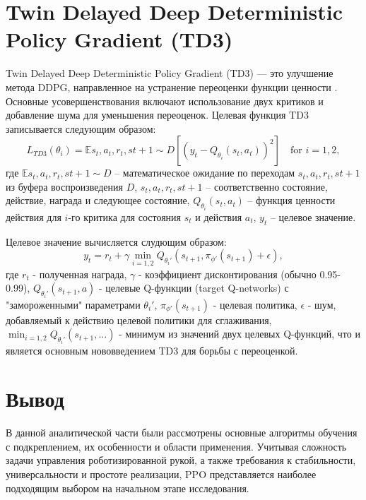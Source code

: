 \section{Twin Delayed Deep Deterministic Policy Gradient (TD3)}
Twin Delayed Deep Deterministic Policy Gradient (TD3) — это улучшение метода DDPG, 
направленное на устранение переоценки функции ценности \cite{lib:rlmethods}. 
Основные усовершенствования включают использование двух критиков и добавление шума для уменьшения переоценок. 
Целевая функция TD3 записывается следующим образом:
\begin{equation}
L_{TD3}(\theta_i) = \mathbb{E}{s_t, a_t, r_t, s{t+1} \sim D} \left[ \left( y_t - Q_{\theta_i}(s_t, a_t) \right)^2 \right] \quad \text{for } i = 1, 2,
\end{equation}
где 
$\mathbb{E}{s_t, a_t, r_t, s{t+1} \sim D}$ -- математическое ожидание по переходам ${s_t, a_t, r_t, s{t+1}}$ из буфера воспроизведения $D$,
${s_t, a_t, r_t, s{t+1}}$ -- соответственно состояние, действие, награда и следующее состояние,
$Q_{\theta_i}(s_t, a_t)$ -- функция ценности действия для $i$-го критика для состояния $s_t$ и действия $a_t$,
$y_t$ -- целевое значение.

Целевое значение вычисляется слудющим образом:
\begin{equation}
    y_t = r_t + \gamma \min_{i=1,2} Q_{\theta_i'}(s_{t+1}, \pi_{\phi'}(s_{t+1}) + \epsilon),
\end{equation}
где
$r_t$ - полученная награда,
$\gamma$ - коэффициент дисконтирования (обычно 0.95-0.99),
$Q_{\theta_i'}(s_{t+1}, a)$ - целевые Q-функции (target Q-networks) с "замороженными" параметрами $\theta_i'$,
$\pi_{\phi'}(s_{t+1})$ - целевая политика,
$\epsilon$ - шум, добавляемый к действию целевой политики для сглаживания,
$\min_{i=1,2} Q_{\theta_i'}(s_{t+1}, ...)$ - минимум из значений двух целевых Q-функций, что и является основным нововведением TD3 для борьбы с переоценкой.

\section*{Вывод}
В данной аналитической части были рассмотрены основные алгоритмы обучения с подкреплением, их особенности и области применения. 
Учитывая сложность задачи управления роботизированной рукой, а также требования к стабильности, 
универсальности и простоте реализации, PPO представляется наиболее подходящим выбором на начальном этапе исследования. 

\clearpage

